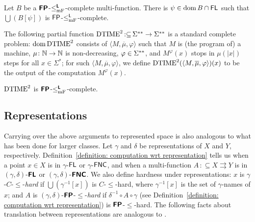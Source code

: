 \documentclass[a4paper,UKenglish]{lipics}
\newcommand{\pcolon}{\mathpunct{\,:\subseteq}}
\begin{document}
\begin{lemma}
\label{lemma:P-complete}
Let $B$ be a $\text{\bfseries \sffamily \upshape FP}$-$\leq _{\mathrm{mF}} ^{\text{\bfseries \sffamily \upshape L}}$-complete multi-function.
There is $\psi \in \mathop{\rm dom} B \cap \mathsf{FL}$ such that
 $\bigcup (B[\psi])$ is $\mathsf{FP}$-$\le^{\mathsf{L}}_{\mathrm{mF}}$-complete.
\end{lemma}

The following partial function $\probDTIMEtwo \pcolon \LM \to \LM$ 
is a standard complete problem: 
$\mathop{\rm dom} \mathrm{DTIME}^2$ consists of $\langle M, \overline \mu, \varphi \rangle$
such that $M$ is (the program of) a machine, 
$\mu \colon \mathbb N \to \mathbb N$ is non-decreasing, 
$\varphi \in \Sigma ^{**}$, 
and $M^\varphi(x)$ stops in $\mu(|x|)$ steps for all $x \in \Sigma^*$; 
for such $\langle M, \overline \mu, \varphi \rangle$, 
we define $\mathrm{DTIME}^2(\langle M, \overline \mu, \varphi \rangle)(x)$ to be 
the output of the computation $M^\varphi(x)$.

\begin{lemma}
\label{lemma: probDTIMEtwo}
 $\mathrm{DTIME}^2$ is $\text{\bfseries \sffamily \upshape FP}$-$\leq _{\mathrm{mF}} ^{\text{\bfseries \sffamily \upshape L}}$-complete.
\end{lemma}




\subsection{Representations}
\newcommand{\transL}{\preceq_\classLtwo}

Carrying over the above arguments to represented space 
is also analogous to what has been done \cite{kawamura2012complexity} for larger classes. 
Let $\gamma$ and $\delta$ be representations of $X$ and $Y$, respectively.
Definition~\ref{definition: computation wrt representation} 
tells us when 
a point $x \in X$ is in $\gamma$-$\mathsf{FL}$ or $\gamma$-$\mathsf{FNC}$, 
and when a multi-function $A \pcolon X \rightrightarrows Y$ is in
$(\gamma, \delta)$-$\text{\bfseries \sffamily \upshape FL}$ or
$(\gamma, \delta)$-$\text{\bfseries \sffamily \upshape FNC}$. 
We also define hardness under representations: 
$x$ is $\gamma$-$C$-$\le$-\emph{hard} if
$\bigcup(\gamma^{-1}[x])$ is $C$-$\le$-hard,
where $\gamma^{-1}[x]$ is the set of $\gamma$-names of $x$; 
and $A$ is $(\gamma, \delta)$-$\text{\bfseries \sffamily \upshape FP}$-$\le$-\emph{hard}
if $\delta^{-1} \circ A \circ \gamma$ 
(see Definition~\ref{definition: computation wrt representation}) 
is $\text{\bfseries \sffamily \upshape FP}$-$\le$-hard.
The following facts
about translation between representations are
analogous to \cite{kawamura2012complexity}. 
\end{document}
